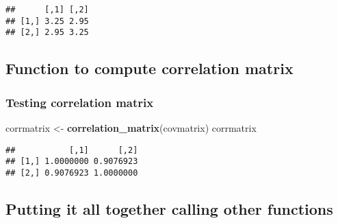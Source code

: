 \documentclass[]{article}
\newenvironment{Shaded}{\begin{snugshade}}{\end{snugshade}}
\newcommand{\ControlFlowTok}[1]{\textcolor[rgb]{0.13,0.29,0.53}{\textbf{#1}}}
\newcommand{\DecValTok}[1]{\textcolor[rgb]{0.00,0.00,0.81}{#1}}
\newcommand{\KeywordTok}[1]{\textcolor[rgb]{0.13,0.29,0.53}{\textbf{#1}}}
\newcommand{\NormalTok}[1]{#1}
\newcommand{\OperatorTok}[1]{\textcolor[rgb]{0.81,0.36,0.00}{\textbf{#1}}}
\newcommand{\StringTok}[1]{\textcolor[rgb]{0.31,0.60,0.02}{#1}}
\begin{document}
\begin{verbatim}
##      [,1] [,2]
## [1,] 3.25 2.95
## [2,] 2.95 3.25
\end{verbatim}

\hypertarget{function-to-compute-correlation-matrix}{%
\subsection{Function to compute correlation
matrix}\label{function-to-compute-correlation-matrix}}

\begin{Shaded}
\end{Shaded}

\hypertarget{testing-correlation-matrix}{%
\subsubsection{Testing correlation
matrix}\label{testing-correlation-matrix}}

\begin{Shaded}
\begin{Highlighting}[]
\NormalTok{corrmatrix <-}\StringTok{ }\KeywordTok{correlation_matrix}\NormalTok{(covmatrix)}
\NormalTok{corrmatrix}
\end{Highlighting}
\end{Shaded}

\begin{verbatim}
##           [,1]      [,2]
## [1,] 1.0000000 0.9076923
## [2,] 0.9076923 1.0000000
\end{verbatim}

\hypertarget{putting-it-all-together-calling-other-functions}{%
\subsection{Putting it all together calling other
functions}\label{putting-it-all-together-calling-other-functions}}
\end{document}
